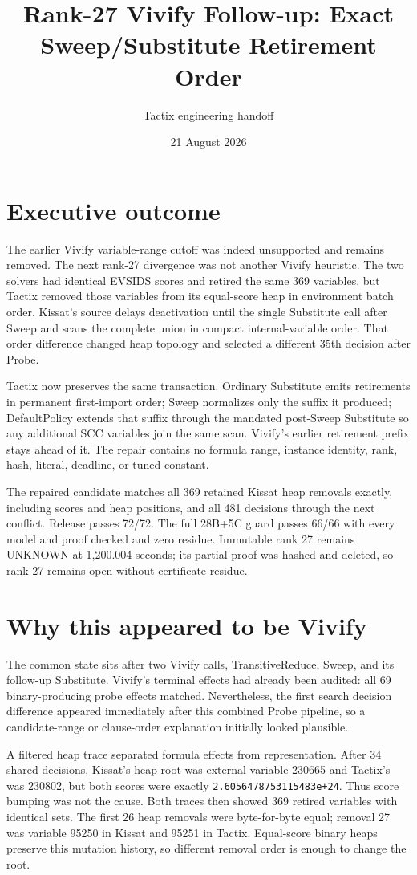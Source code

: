 \documentclass[11pt]{article}
\title{Rank-27 Vivify Follow-up: Exact Sweep/Substitute Retirement Order}
\author{Tactix engineering handoff}
\date{21 August 2026}
\newcommand{\code}[1]{\texttt{#1}}
\begin{document}
\maketitle

\section*{Executive outcome}
The earlier Vivify variable-range cutoff was indeed unsupported and remains
removed.  The next rank-27 divergence was not another Vivify heuristic.  The
two solvers had identical EVSIDS scores and retired the same 369 variables,
but Tactix removed those variables from its equal-score heap in environment
batch order.  Kissat's source delays deactivation until the single Substitute
call after Sweep and scans the complete union in compact internal-variable
order.  That order difference changed heap topology and selected a different
35th decision after Probe.

Tactix now preserves the same transaction.  Ordinary Substitute emits
retirements in permanent first-import order; Sweep normalizes only the suffix
it produced; DefaultPolicy extends that suffix through the mandated
post-Sweep Substitute so any additional SCC variables join the same scan.
Vivify's earlier retirement prefix stays ahead of it.  The repair contains no
formula range, instance identity, rank, hash, literal, deadline, or tuned
constant.

The repaired candidate matches all 369 retained Kissat heap removals exactly,
including scores and heap positions, and all 481 decisions through the next
conflict.  Release passes 72/72.  The full 28B+5C guard passes 66/66 with every
model and proof checked and zero residue.  Immutable rank 27 remains UNKNOWN
at 1,200.004 seconds; its partial proof was hashed and deleted, so rank 27
remains open without certificate residue.

\section*{Why this appeared to be Vivify}
The common state sits after two Vivify calls, TransitiveReduce, Sweep, and its
follow-up Substitute.  Vivify's terminal effects had already been audited:
all 69 binary-producing probe effects matched.  Nevertheless, the first
search decision difference appeared immediately after this combined Probe
pipeline, so a candidate-range or clause-order explanation initially looked
plausible.

A filtered heap trace separated formula effects from representation.  After
34 shared decisions, Kissat's heap root was external variable 230665 and
Tactix's was 230802, but both scores were exactly
\code{2.6056478753115483e+24}.  Thus score bumping was not the cause.  Both
traces then showed 369 retired variables with identical sets.  The first 26
heap removals were byte-for-byte equal; removal 27 was variable 95250 in
Kissat and 95251 in Tactix.  Equal-score binary heaps preserve this mutation
history, so different removal order is enough to change the root.
\end{document}
